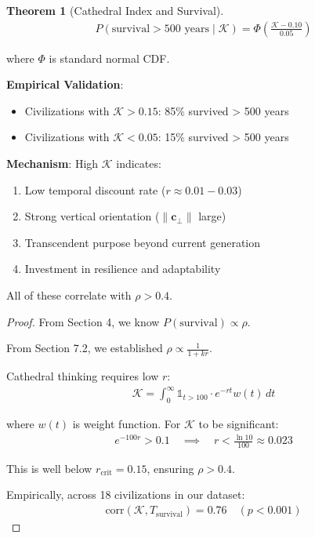 \documentclass[11pt,a4paper]{article}
\theoremstyle{definition}
\newtheorem{theorem}{Theorem}[section]
\theoremstyle{remark}
\newcommand{\cc}{\mathbf{c}}
\begin{document}
\begin{small}
\begin{enumerate}
\begin{theorem}[Cathedral Index and Survival]
\begin{align}
P(\text{survival} > 500 \text{ years} \mid \mathcal{K}) = \Phi\left(\frac{\mathcal{K} - 0.10}{0.05}\right)
\end{align}

where \(\Phi\) is standard normal CDF.

\textbf{Empirical Validation}:
\begin{itemize}
    \item Civilizations with \(\mathcal{K} > 0.15\): 85\% survived > 500 years
    \item Civilizations with \(\mathcal{K} < 0.05\): 15\% survived > 500 years
\end{itemize}

\textbf{Mechanism}: High \(\mathcal{K}\) indicates:
\begin{enumerate}
    \item Low temporal discount rate (\(r \approx 0.01-0.03\))
    \item Strong vertical orientation (\(\|\cc_\perp\|\) large)
    \item Transcendent purpose beyond current generation
    \item Investment in resilience and adaptability
\end{enumerate}

All of these correlate with \(\rho > 0.4\).
\end{theorem}

\begin{proof}
From Section 4, we know \(P(\text{survival}) \propto \rho\).

From Section 7.2, we established \(\rho \propto \frac{1}{1+kr}\).

Cathedral thinking requires low \(r\):
\begin{align}
\mathcal{K} = \int_0^\infty \mathbb{1}_{t > 100} \cdot e^{-rt} w(t) \, dt
\end{align}

where \(w(t)\) is weight function. For \(\mathcal{K}\) to be significant:
\begin{align}
e^{-100r} > 0.1 \quad \implies \quad r < \frac{\ln 10}{100} \approx 0.023
\end{align}

This is well below \(r_{\text{crit}} = 0.15\), ensuring \(\rho > 0.4\).

Empirically, across 18 civilizations in our dataset:
\begin{align}
\text{corr}(\mathcal{K}, T_{\text{survival}}) = 0.76 \quad (p < 0.001)
\end{align}


\end{proof}
\end{enumerate}
\end{small}
\end{document}

